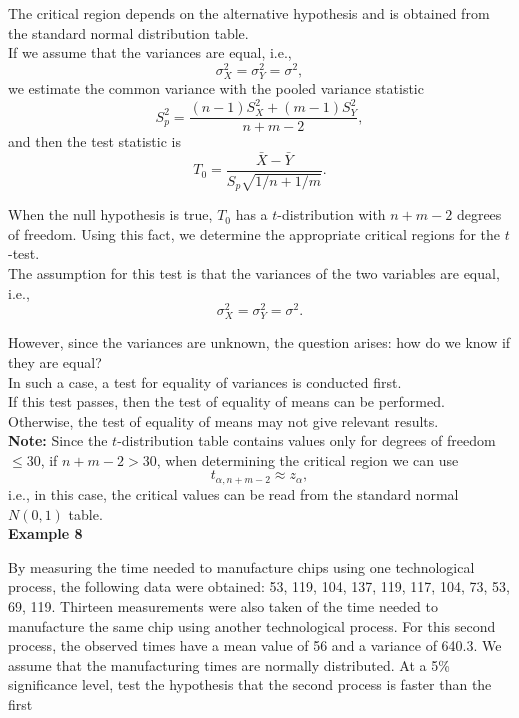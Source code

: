 \documentclass[a4paper, 12pt]{article}
\begin{document}
The critical region depends on the alternative hypothesis and is obtained from the standard normal distribution table.  \\

If we assume that the variances are equal, i.e., 
\[
\sigma_X^2 = \sigma_Y^2 = \sigma^2,
\] 
we estimate the common variance with the pooled variance statistic
\[
S_p^2 = \frac{(n-1)S_X^2 + (m-1)S_Y^2}{n + m - 2},
\] 
and then the test statistic is
\[
T_0 = \frac{\bar{X} - \bar{Y}}{S_p \sqrt{1/n + 1/m}}.
\]  

When the null hypothesis is true, $T_0$ has a $t$-distribution with $n + m - 2$ degrees of freedom. Using this fact, we determine the appropriate critical regions for the $t$-test.\\


The assumption for this test is that the variances of the two variables are equal, i.e.,
\[
\sigma_X^2 = \sigma_Y^2 = \sigma^2.
\]

However, since the variances are unknown, the question arises: how do we know if they are equal?  \\

In such a case, a test for equality of variances is conducted first.  \\

If this test passes, then the test of equality of means can be performed. Otherwise, the test of equality of means may not give relevant results.  \\

\textbf{Note:} Since the $t$-distribution table contains values only for degrees of freedom $\le 30$, if $n + m - 2 > 30$, when determining the critical region we can use
\[
t_{\alpha, n+m-2} \approx z_\alpha,
\]
i.e., in this case, the critical values can be read from the standard normal $N(0,1)$ table.\\


\textbf{Example 8}

By measuring the time needed to manufacture chips using one technological
process, the following data were obtained: 53, 119, 104, 137, 119, 117, 104,
73, 53, 69, 119. Thirteen measurements were also taken of the time needed to
manufacture the same chip using another technological process. For this
second process, the observed times have a mean value of 56 and a variance
of 640.3. We assume that the manufacturing times are normally distributed.
At a 5\% significance level, test the hypothesis that the second process is
faster than the first\\
\end{document}
